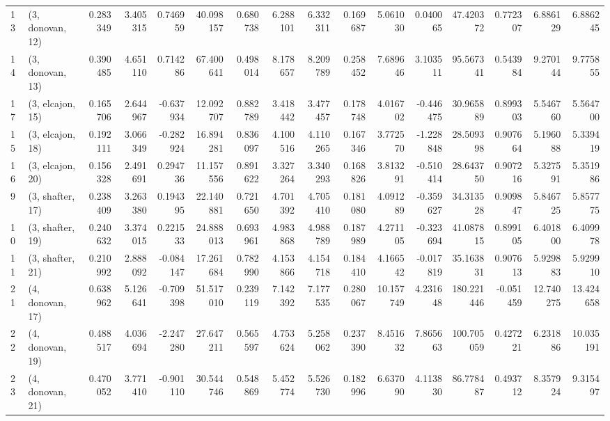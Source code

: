 \begin{tabular}{llrrrrrrrrrrrrrr}
13 &  (3, donovan, 12) &   0.283349 &  3.405315 &  0.746959 &  40.098157 &  0.680738 &   6.288101 &  6.332311 &  0.169687 &   5.061030 &  0.040065 &   47.420372 &  0.772307 &   6.886129 &   6.886245 \\
14 &  (3, donovan, 13) &   0.390485 &  4.651110 &  0.714286 &  67.400641 &  0.498014 &   8.178657 &  8.209789 &  0.258452 &   7.689646 &  3.103511 &   95.567341 &  0.543984 &   9.270144 &   9.775855 \\
17 &  (3, elcajon, 15) &   0.165706 &  2.644967 & -0.637934 &  12.092707 &  0.882789 &   3.418442 &  3.477457 &  0.178748 &   4.016702 & -0.446475 &   30.965889 &  0.899303 &   5.546760 &   5.564700 \\
15 &  (3, elcajon, 18) &   0.192111 &  3.066349 & -0.282924 &  16.894281 &  0.836097 &   4.100516 &  4.110265 &  0.167346 &   3.772570 & -1.228848 &   28.509398 &  0.907664 &   5.196088 &   5.339419 \\
16 &  (3, elcajon, 20) &   0.156328 &  2.491691 &  0.294736 &  11.157556 &  0.891622 &   3.327264 &  3.340293 &  0.168826 &   3.813291 & -0.510414 &   28.643750 &  0.907216 &   5.327591 &   5.351986 \\
9  &  (3, shafter, 17) &   0.238409 &  3.263380 &  0.194395 &  22.140881 &  0.721650 &   4.701392 &  4.705410 &  0.181080 &   4.091289 & -0.359627 &   34.313528 &  0.909847 &   5.846725 &   5.857775 \\
10 &  (3, shafter, 19) &   0.240632 &  3.374015 &  0.221533 &  24.888013 &  0.693961 &   4.983868 &  4.988789 &  0.187989 &   4.271105 & -0.323694 &   41.087815 &  0.899105 &   6.401800 &   6.409978 \\
11 &  (3, shafter, 21) &   0.210992 &  2.888092 & -0.084147 &  17.261684 &  0.782990 &   4.153866 &  4.154718 &  0.184410 &   4.166542 & -0.017819 &   35.163831 &  0.907613 &   5.929883 &   5.929910 \\
21 &  (4, donovan, 17) &   0.638962 &  5.126641 & -0.709398 &  51.517010 &  0.239119 &   7.142392 &  7.177535 &  0.280067 &  10.157749 &  4.231648 &  180.221446 & -0.051459 &  12.740275 &  13.424658 \\
22 &  (4, donovan, 19) &   0.488517 &  4.036694 & -2.247280 &  27.647211 &  0.565597 &   4.753624 &  5.258062 &  0.237390 &   8.451632 &  7.865663 &  100.705059 &  0.427221 &   6.231886 &  10.035191 \\
23 &  (4, donovan, 21) &   0.470052 &  3.771410 & -0.901110 &  30.544746 &  0.548869 &   5.452774 &  5.526730 &  0.182996 &   6.637090 &  4.113830 &   86.778487 &  0.493712 &   8.357924 &   9.315497 \\

\end{tabular}
